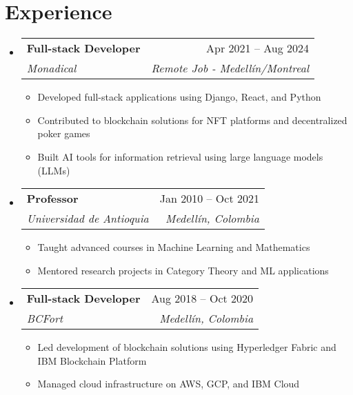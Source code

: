 \documentclass[letterpaper,11pt]{article}
\makeatletter
\newcommand{\resumeSubheading}[4]{
  \vspace{-2pt}
  \item[]
  \begin{tabular*}{\textwidth}{@{\extracolsep{\fill}}l r}
    \textbf{#1} & #2 \\
    \textit{#3} & \textit{#4} \\
  \end{tabular*}
  \vspace{-5pt}
}
\makeatother
\begin{document}
\section{Experience}
\begin{itemize}[leftmargin=0pt, itemindent=0pt, label={}]
\resumeSubheading
{Full-stack Developer}{Apr 2021 -- Aug 2024}
{Monadical}{Remote Job - Medellín/Montreal}
\begin{itemize}[leftmargin=*]
    \item Developed full-stack applications using Django, React, and Python
    \item Contributed to blockchain solutions for NFT platforms and decentralized poker games
    \item Built AI tools for information retrieval using large language models (LLMs)
\end{itemize}

\resumeSubheading
{Professor}{Jan 2010 -- Oct 2021}
{Universidad de Antioquia}{Medellín, Colombia}
\begin{itemize}[leftmargin=*]
    \item Taught advanced courses in Machine Learning and Mathematics
    \item Mentored research projects in Category Theory and ML applications
\end{itemize}

\resumeSubheading
{Full-stack Developer}{Aug 2018 -- Oct 2020}
{BCFort}{Medellín, Colombia}
\begin{itemize}[leftmargin=*]
    \item  Led development of blockchain solutions using Hyperledger Fabric and IBM Blockchain Platform
    \item Managed cloud infrastructure on AWS, GCP, and IBM Cloud
\end{itemize}
\end{itemize}
\end{document}
